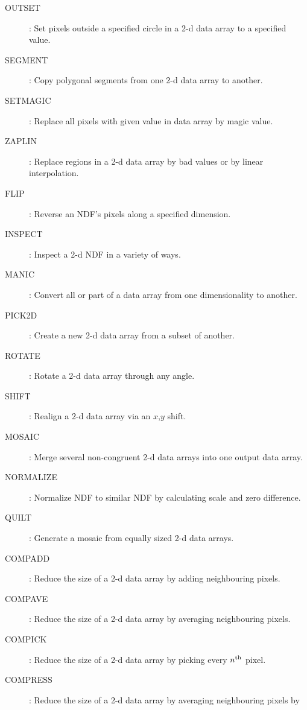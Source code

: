 \begin{description}
\begin {description}
\begin{description}
\item [OUTSET]:
 Set pixels outside a specified circle in a 2-d data array to a specified
 value.
\item [SEGMENT]:
 Copy polygonal segments from one 2-d data array to another.
\item [SETMAGIC]:
 Replace all pixels with given value in data array by magic value.
\item [ZAPLIN]:
 Replace regions in a 2-d data array by bad values or by linear interpolation.
\end{description}
\item [Configuration change:]\hfill
\begin{description}
\item [FLIP]:
 Reverse an NDF's pixels along a specified dimension.
\item [INSPECT]:
 Inspect a 2-d NDF in a variety of ways.
\item [MANIC]:
 Convert all or part of a data array from one dimensionality to another.
\item [PICK2D]:
 Create a new 2-d data array from a subset of another.
\item [ROTATE]:
 Rotate a 2-d data array through any angle.
\item [SHIFT]:
 Realign a 2-d data array via an $x$,$y$ shift.
\end{description}
\item [Combination:]\hfill
\begin{description}
\item [MOSAIC]:
 Merge several non-congruent 2-d data arrays into one output data array.
\item [NORMALIZE]:
 Normalize NDF to similar NDF by calculating scale and zero difference.
\item [QUILT]:
 Generate a mosaic from equally sized 2-d data arrays.
\end{description}
\item [Compression and Expansion:]\hfill
\begin {description}
\item [COMPADD]:
 Reduce the size of a 2-d data array by adding neighbouring pixels.
\item [COMPAVE]:
 Reduce the size of a 2-d data array by averaging neighbouring pixels.
\item [COMPICK]:
 Reduce the size of a 2-d data array by picking every $n^{\rm th}$ pixel.
\item [COMPRESS]:
 Reduce the size of a 2-d data array by averaging neighbouring pixels by

\end{description}
\end{description}
\end{description}
